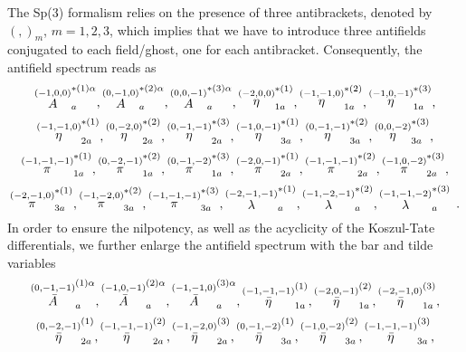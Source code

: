 \documentclass[a4paper,10pt]{article}
\begin{document}
The Sp(3) formalism relies on the presence of three antibrackets, denoted by 
$\left( ,\right) _{m}$, $m=1,2,3$, which implies that we have to introduce
three antifields conjugated to each field/ghost, one for each antibracket.
Consequently, the antifield spectrum reads as 
\begin{equation}
\label{9}
\stackrel{(-1,0,0)}{A}_{a}^{*(1)\alpha },\stackrel{(0,-1,0)}{A}%
_{a}^{*(2)\alpha },\stackrel{(0,0,-1)}{A}_{a}^{*(3)\alpha },\stackrel{%
(-2,0,0)}{\eta }_{1a}^{*(1)},\stackrel{(-1,-1,0)}{\eta }_{1a}^{*(2)},%
\stackrel{(-1,0,-1)}{\eta }_{1a}^{*(3)},
\end{equation}
\begin{equation}
\label{10}
\stackrel{(-1,-1,0)}{\eta }_{2a}^{*(1)},\stackrel{(0,-2,0)}{\eta }%
_{2a}^{*(2)},\stackrel{(0,-1,-1)}{\eta }_{2a}^{*(3)},\stackrel{(-1,0,-1)}{%
\eta }_{3a}^{*(1)},\stackrel{(0,-1,-1)}{\eta }_{3a}^{*(2)},\stackrel{(0,0,-2)%
}{\eta }_{3a}^{*(3)},
\end{equation}
\begin{equation}
\label{11}
\stackrel{(-1,-1,-1)}{\pi }_{1a}^{*(1)},\stackrel{(0,-2,-1)}{\pi }%
_{1a}^{*(2)},\stackrel{(0,-1,-2)}{\pi }_{1a}^{*(3)},\stackrel{(-2,0,-1)}{\pi 
}_{2a}^{*(1)},\stackrel{(-1,-1,-1)}{\pi }_{2a}^{*(2)},\stackrel{(-1,0,-2)}{%
\pi }_{2a}^{*(3)},
\end{equation}
\begin{equation}
\label{12}
\stackrel{(-2,-1,0)}{\pi }_{3a}^{*(1)},\stackrel{(-1,-2,0)}{\pi }%
_{3a}^{*(2)},\stackrel{(-1,-1,-1)}{\pi }_{3a}^{*(3)},\stackrel{(-2,-1,-1)}{%
\lambda }_{a}^{*(1)},\stackrel{(-1,-2,-1)}{\lambda }_{a}^{*(2)},\stackrel{%
(-1,-1,-2)}{\lambda }_{a}^{*(3)}\,.
\end{equation}
In order to ensure the nilpotency, as
well as the acyclicity of the Koszul-Tate differentials, we further enlarge
the antifield spectrum with the bar and tilde variables~\cite{sp3gen} 
\begin{equation}
\label{13}
\stackrel{(0,-1,-1)}{\bar{A}}_{a}^{(1)\alpha },\stackrel{(-1,0,-1)}{\bar{A}}%
_{a}^{(2)\alpha },\stackrel{(-1,-1,0)}{\bar{A}}_{a}^{(3)\alpha },\stackrel{%
(-1,-1,-1)}{\bar{\eta}}_{1a}^{(1)},\stackrel{(-2,0,-1)}{\bar{\eta}}%
_{1a}^{(2)},\stackrel{(-2,-1,0)}{\bar{\eta}}_{1a}^{(3)},
\end{equation}
\begin{equation}
\label{14}
\stackrel{(0,-2,-1)}{\bar{\eta}}_{2a}^{(1)},\stackrel{(-1,-1,-1)}{\bar{\eta}}%
_{2a}^{(2)},\stackrel{(-1,-2,0)}{\bar{\eta}}_{2a}^{(3)},\stackrel{(0,-1,-2)}{%
\bar{\eta}}_{3a}^{(1)},\stackrel{(-1,0,-2)}{\bar{\eta}}_{3a}^{(2)},\stackrel{%
(-1,-1,-1)}{\bar{\eta}}_{3a}^{(3)},
\end{equation}
\end{document}
